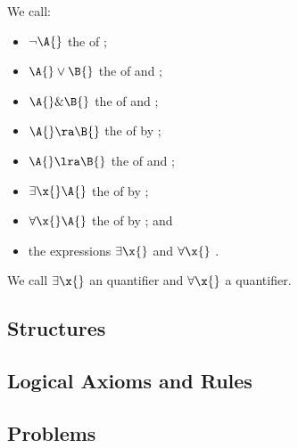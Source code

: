 \begin{shaded*}
    We call:
        \begin{itemize}
            \item $\neg \A{}$ the  of \A{};
            \item $\A{} \vee \B{}$ the  of \A{} and \B{};
            \item $\A{} \& \B{}$ the  of \A{} and \B{};
            \item $\A{} \ra \B{}$ the  of \B{} by \A{};
            \item $\A{} \lra \B{}$ the  of \A{} and \B{};
            \item $\exists \x{} \A{}$ the  of \A{} by \x{};
            \item $\forall \x{} \A{}$ the  of \A{} by \x{}; and
            \item the expressions $\exists \x{}$ and $\forall \x{}$  \x{}.
        \end{itemize}
\end{shaded*}

\begin{remark}
        We call $\exists \x{}$ an  quantifier and $\forall \x{}$ a  quantifier.
\end{remark}


\subsection{Structures}


\subsection{Logical Axioms and Rules}


\subsection{Problems}
